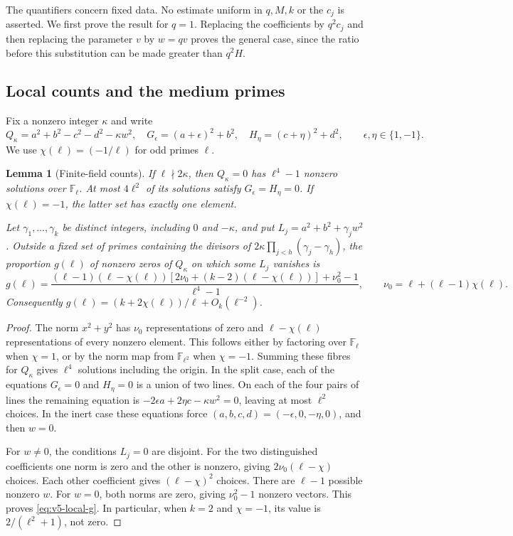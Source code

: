 \documentclass[11pt]{article}
\newtheorem{lemma}[theorem]{Lemma}
\theoremstyle{definition}
\theoremstyle{remark}
\begin{document}
The quantifiers concern fixed data. No estimate uniform in $q,M,k$ or the
$c_j$ is asserted. We first prove the result for $q=1$. Replacing the
coefficients by $q^2c_j$ and then replacing the parameter $v$ by $w=qv$
proves the general case, since the ratio before this substitution can be
made greater than $q^2H$.

\subsection{Local counts and the medium primes}\label{subsec:v5-local-sieve}

Fix a nonzero integer $\kappa$ and write
\[
 Q_\kappa=a^2+b^2-c^2-d^2-\kappa w^2,\quad
 G_\epsilon=(a+\epsilon)^2+b^2,\quad
 H_\eta=(c+\eta)^2+d^2,
 \qquad \epsilon,\eta\in\{1,-1\}.
\]
We use $\chi(\ell)=(-1/\ell)$ for odd primes $\ell$.

\begin{lemma}[Finite-field counts]\label{lem:v5-local-counts}
If $\ell\nmid2\kappa$, then $Q_\kappa=0$ has $\ell^4-1$ nonzero
solutions over $\mathbb F_\ell$. At most $4\ell^2$ of its solutions satisfy
$G_\epsilon=H_\eta=0$. If $\chi(\ell)=-1$, the latter set has exactly one
element.

Let $\gamma_1,\ldots,\gamma_k$ be distinct integers, including $0$ and
$-\kappa$, and put $L_j=a^2+b^2+\gamma_jw^2$. Outside a fixed set of primes
containing the divisors of $2\kappa\prod_{j<h}(\gamma_j-\gamma_h)$, the
proportion $g(\ell)$ of nonzero zeros of $Q_\kappa$ on which some $L_j$
vanishes is
\begin{equation}\label{eq:v5-local-g}
 g(\ell)=
 \frac{(\ell-1)(\ell-\chi(\ell))
 [2\nu_0+(k-2)(\ell-\chi(\ell))]+\nu_0^2-1}{\ell^4-1},
 \qquad \nu_0=\ell+(\ell-1)\chi(\ell).
\end{equation}
Consequently $g(\ell)=(k+2\chi(\ell))/\ell+O_k(\ell^{-2})$.
\end{lemma}
\begin{proof}
The norm $x^2+y^2$ has $\nu_0$ representations of zero and
$\ell-\chi(\ell)$ representations of every nonzero element. This follows
either by factoring over $\mathbb F_\ell$ when $\chi=1$, or by the norm map
from $\mathbb F_{\ell^2}$ when $\chi=-1$. Summing these fibres for
$Q_\kappa$ gives $\ell^4$ solutions including the origin.
In the split case, each of the equations $G_\epsilon=0$ and $H_\eta=0$
is a union of two lines. On each of the four pairs of lines the remaining
equation is
$-2\epsilon a+2\eta c-\kappa w^2=0$, leaving at most $\ell^2$ choices.
In the inert case these equations force
$(a,b,c,d)=(-\epsilon,0,-\eta,0)$, and then $w=0$.

For $w\ne0$, the conditions $L_j=0$ are disjoint. For the two distinguished
coefficients one norm is zero and the other is nonzero, giving
$2\nu_0(\ell-\chi)$ choices. Each other coefficient gives
$(\ell-\chi)^2$ choices. There are $\ell-1$ possible nonzero $w$.
For $w=0$, both norms are zero, giving $\nu_0^2-1$ nonzero vectors.
This proves \eqref{eq:v5-local-g}. In particular, when $k=2$ and
$\chi=-1$, its value is $2/(\ell^2+1)$, not zero.
\end{proof}
\end{document}
